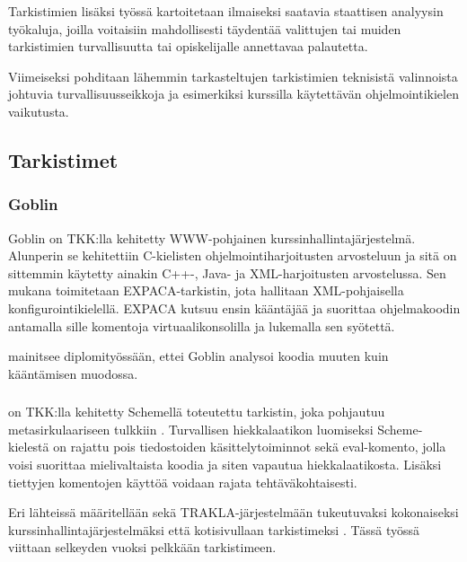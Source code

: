 Tarkistimien lisäksi työssä kartoitetaan ilmaiseksi saatavia staattisen
analyysin työkaluja, joilla voitaisiin mahdollisesti täydentää valittujen tai
muiden tarkistimien turvallisuutta tai opiskelijalle annettavaa palautetta.

Viimeiseksi pohditaan lähemmin tarkasteltujen tarkistimien teknisistä
valinnoista johtuvia turvallisuusseikkoja ja esimerkiksi kurssilla käytettävän
ohjelmointikielen vaikutusta.

\subsection{Tarkistimet}

\subsubsection{Goblin}

Goblin on TKK:lla kehitetty WWW-pohjainen kurssinhallintajärjestelmä.
Alunperin se kehitettiin C-kielisten ohjelmointiharjoitusten arvosteluun
ja sitä on sittemmin käytetty ainakin C++-, Java- ja XML-harjoitusten
arvostelussa. Sen mukana toimitetaan EXPACA-tarkistin, jota hallitaan
XML-pohjaisella konfigurointikielellä. EXPACA kutsuu ensin kääntäjää ja
suorittaa ohjelmakoodin antamalla sille komentoja virtuaalikonsolilla ja
lukemalla sen syötettä. \citep{Hiisila2005}

\citet{Hiisila2005} mainitsee diplomityössään, ettei Goblin analysoi koodia muuten
kuin kääntämisen muodossa.

\subsubsection{\scmrobo}

{\scmrobo} on TKK:lla kehitetty Schemellä toteutettu tarkistin, joka pohjautuu
metasirkulaariseen tulkkiin \citep{sicp}. Turvallisen hiekkalaatikon luomiseksi
Scheme-kielestä on rajattu pois tiedostoiden käsittelytoiminnot
\citep{saikkonen2001fully} sekä eval-komento, jolla
voisi suorittaa mielivaltaista koodia ja siten vapautua hiekkalaatikosta.
Lisäksi tiettyjen komentojen käyttöä voidaan rajata tehtäväkohtaisesti.
\citep{liljasaikkonen}

Eri lähteissä {\scmrobo} määritellään sekä TRAKLA-järjestelmään \citep{trakla}
tukeutuvaksi kokonaiseksi kurssinhallintajärjestelmäksi
\citep{saikkonen2001fully} että kotisivullaan tarkistimeksi
\citep{liljasaikkonen}. Tässä työssä viittaan selkeyden vuoksi pelkkään
tarkistimeen.

